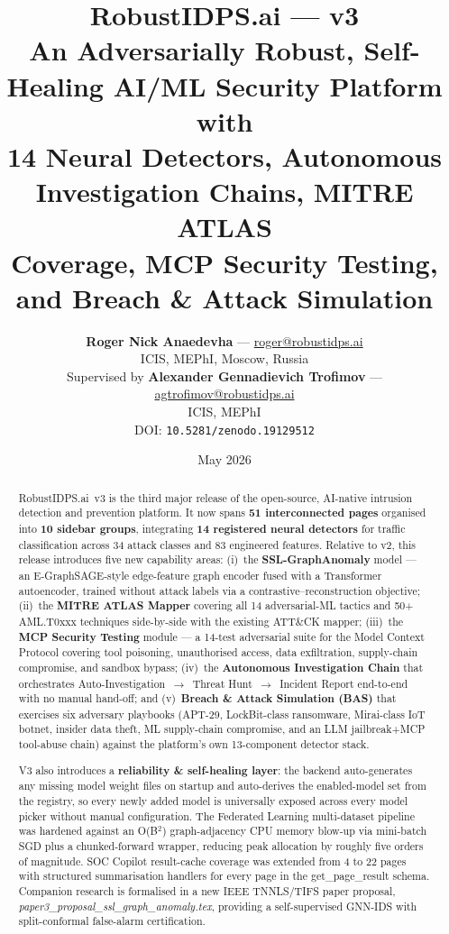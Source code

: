 \documentclass[11pt,a4paper]{article}
\title{%
  \vspace{-1cm}
  {\LARGE\bfseries RobustIDPS.ai --- v3}\\[6pt]
  {\large An Adversarially Robust, Self-Healing AI/ML Security Platform with\\
   14 Neural Detectors, Autonomous Investigation Chains, MITRE ATLAS\\
   Coverage, MCP Security Testing, and Breach \& Attack Simulation}}
\author{%
  \textbf{Roger Nick Anaedevha} --- \href{mailto:roger@robustidps.ai}{roger@robustidps.ai}\\
  ICIS, MEPhI, Moscow, Russia\\[6pt]
  Supervised by \textbf{Alexander Gennadievich Trofimov} --- \href{mailto:agtrofimov@robustidps.ai}{agtrofimov@robustidps.ai}\\
  ICIS, MEPhI\\[8pt]
  \normalsize DOI: \texttt{10.5281/zenodo.19129512}}
\date{May 2026}
\begin{document}
\maketitle
\thispagestyle{fancy}

\begin{abstract}
\noindent
RobustIDPS.ai~v3 is the third major release of the open-source, AI-native
intrusion detection and prevention platform.  It now spans \textbf{51
interconnected pages} organised into \textbf{10 sidebar groups},
integrating \textbf{14 registered neural detectors} for traffic
classification across 34 attack classes and 83 engineered features.
Relative to v2, this release introduces five new capability areas:
(i)~the \textbf{SSL-GraphAnomaly} model --- an E-GraphSAGE-style edge-feature
graph encoder fused with a Transformer autoencoder, trained without
attack labels via a contrastive--reconstruction objective; (ii)~the
\textbf{MITRE ATLAS Mapper} covering all 14 adversarial-ML tactics and
50+ AML.T0xxx techniques side-by-side with the existing ATT\&CK mapper;
(iii)~the \textbf{MCP Security Testing} module --- a 14-test adversarial
suite for the Model Context Protocol covering tool poisoning,
unauthorised access, data exfiltration, supply-chain compromise, and
sandbox bypass; (iv)~the \textbf{Autonomous Investigation Chain} that
orchestrates Auto-Investigation~$\to$~Threat Hunt~$\to$~Incident Report
end-to-end with no manual hand-off; and (v)~\textbf{Breach \& Attack
Simulation (BAS)} that exercises six adversary playbooks (APT-29,
LockBit-class ransomware, Mirai-class IoT botnet, insider data theft,
ML supply-chain compromise, and an LLM jailbreak+MCP tool-abuse chain)
against the platform's own 13-component detector stack.

V3 also introduces a \textbf{reliability \& self-healing layer}: the
backend auto-generates any missing model weight files on startup and
auto-derives the enabled-model set from the registry, so every newly
added model is universally exposed across every model picker without
manual configuration.  The Federated Learning multi-dataset pipeline
was hardened against an O(B$^2$) graph-adjacency CPU memory blow-up via
mini-batch SGD plus a chunked-forward wrapper, reducing peak allocation
by roughly five orders of magnitude.  SOC Copilot result-cache coverage
was extended from 4 to 22 pages with structured summarisation handlers
for every page in the get\_page\_result schema.  Companion research is
formalised in a new IEEE TNNLS/TIFS paper proposal,
\emph{paper3\_proposal\_ssl\_graph\_anomaly.tex}, providing a self-supervised
GNN-IDS with split-conformal false-alarm certification.
\end{abstract}
\end{document}
